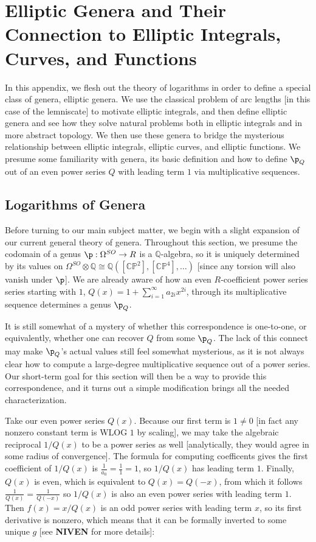 \section{Elliptic Genera and Their Connection to Elliptic Integrals, Curves, and Functions}

In this appendix, we flesh out the theory of logarithms in order to define a special class of genera, elliptic genera. We use the classical problem of arc lengths [in this case of the lemniscate] to motivate elliptic integrals, and then define elliptic genera and see how they solve natural problems both in elliptic integrals and in more abstract topology. We then use these genera to bridge the mysterious relationship between elliptic integrals, elliptic curves, and elliptic functions. We presume some familiarity with genera, its basic definition and how to define $\p_Q$ out of an even power series $Q$ with leading term $1$ via multiplicative sequences. 


\subsection{Logarithms of Genera}
Before turning to our main subject matter, we begin with a slight expansion of our current general theory of genera. Throughout this section, we presume the codomain of a genus $\p: \Omega^{SO} \to R$ is a $\mathbb{Q}$-algebra, so it is uniquely determined by its values on $\Omega^{SO} \otimes \mathbb{Q}\cong \mathbb{Q}( [\mathbb{CP}^2], [\mathbb{CP}^4], \dots )$ [since any torsion will also vanish under $\p$]. We are already aware of how an even $R$-coefficient power series series starting with $1$, $Q(x) = 1 + \sum_{i=1}^\infty a_{2i} x^{2i}$, through its multiplicative sequence determines a genus $\p_Q$. 

It is still somewhat of a mystery of whether this correspondence is one-to-one, or equivalently, whether one can recover $Q$ from some $\p_Q$. The lack of this connect may make $\p_Q$'s actual values still feel somewhat mysterious, as it is not always clear how to compute a large-degree multiplicative sequence out of a power series. Our short-term goal for this section will then be a way to provide this correspondence, and it turns out a simple modification brings all the needed characterization.

Take our even power series $Q(x)$. Because our first term is $1 \neq 0$ [in fact any nonzero constant term is WLOG $1$ by scaling], we may take the algebraic reciprocal $1/Q(x)$ to be a power series as well [analytically, they would agree in some radius of convergence]. The formula for computing coefficents gives the first coefficient of $1/Q(x) $ is $\frac{1}{a_0} = \frac{1}{1} = 1$, so $1/Q(x)$ has leading term $1$. Finally, $Q(x)$ is even, which is equivalent to $Q(x) = Q(-x)$, from which it follows $\frac{1}{Q(x)} = \frac{1}{Q(-x)}$ so $1/Q(x)$ is also an even power series with leading term $1$. Then $f(x) = x/ Q(x)$ is an odd power series with leading term $x$, so its first derivative is nonzero, which means that it can be formally inverted to some unique $g$ [see \textbf{NIVEN} for more details]:

